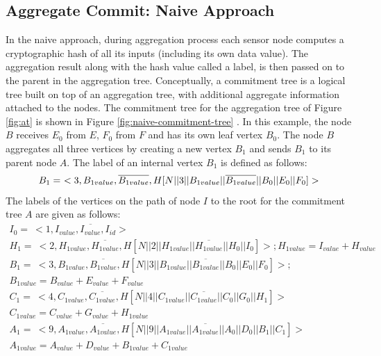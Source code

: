 	\subsection{Aggregate Commit: Naive Approach}
		\label{sub:aggregate_commit_naive_approach}
		In the naive approach, during aggregation process each sensor node computes a cryptographic hash of all its inputs (including its own data value).
		The aggregation result along with the hash value called a label, is then passed on to the parent in the aggregation tree.
		Conceptually, a commitment tree is a logical tree built on top of an aggregation tree, with additional aggregate information attached to the nodes. 
		The commitment tree for the aggregation tree of Figure \ref{fig:at} is  shown in Figure \ref{fig:naive-commitment-tree} .
		In this example, the node $B$ receives $E_{0}$ from $E$, $F_{0}$ from $F$ and has its own leaf vertex $B_{0}$.
		The node $B$ aggregates all three vertices by creating a new vertex $B_{1}$ and sends $B_{1}$ to its parent node $A$.
		The label of an internal vertex $B_{1}$ is defined as follows:
		\begin{equation*}
			B_{1} =\ <3, B_{1value}, \overline{B_{1value}}, H[N || 3 || B_{1value} || \overline{B_{1value}} ||B_{0}||E_{0}||F_{0}]>\\
		\end{equation*}
		The labels of the vertices on the path of node $I$ to the root for the commitment tree $A$ are given as follows:
		\begin{equation*}
			\begin{array}{l}
				I_{0} =\ <1, I_{value}, \overline{I_{value}}, I_{id}>\\
				H_{1} =\ <2, H_{1value}, \overline{H_{1value}}, H [ N || 2 || H_{1value} || \overline{H_{1value}} || H_{0} || I_{0} ] > ; H_{1value} = I_{value} + H_{value}\\
				B_{1} =\ <3, B_{1value}, \overline{B_{1value}}, H [ N || 3 || B_{1value} || \overline{B_{1value}} || B_{0} || E_{0} || F_{0} ] > ; \\ 
				B_{1value} = B_{value} + E_{value} + F_{value} \\
				C_{1} =\ <4, C_{1value}, \overline{C_{1value}}, H [ N || 4 || C_{1value} || \overline{C_{1value}} || C_{0} || G_{0} || H_{1} ] > \\
				C_{1value} = C_{value} + G_{value} + H_{1value} \\
				A_{1} =\ <9, A_{1value}, \overline{A_{1value}}, H [ N || 9 || A_{1value} || \overline{A_{1value}} || A_{0} || D_{0} || B_{1} || C_{1} ] >\\
				A_{1value} = A_{value} + D_{value} + B_{1value} + C_{1value} \\
			\end{array}
		\end{equation*}
